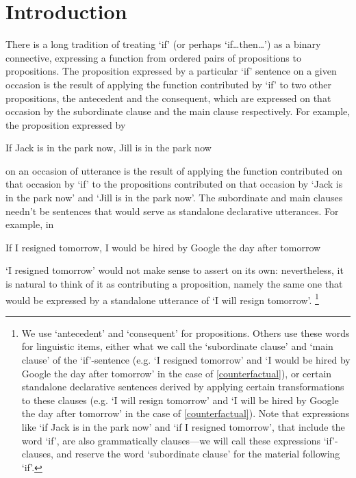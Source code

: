 \documentclass[If.tex]{subfiles}
\begin{document}
 
\chapter*{Introduction}  
There is a long tradition of treating ‘if’ (or perhaps ‘if\ldots then\ldots’) as a binary connective, expressing a function from ordered pairs of propositions to propositions. The proposition expressed by a particular ‘if’ sentence on a given occasion is the result of applying the function contributed by ‘if’ to two other propositions, the antecedent and the consequent, which are expressed on that occasion by the subordinate clause and the main clause respectively. For example, the proposition expressed by
\begin{prop}
	\nitem \label{indicative} 
	If Jack is in the park now, Jill is in the park now
\end{prop}
on an occasion of utterance is the result of applying the function contributed on that occasion by ‘if’ to the propositions contributed on that occasion by ‘Jack is in the park now’ and ‘Jill is in the park now’. The subordinate and main clauses needn't be sentences that would serve as standalone declarative utterances. For example, in
\begin{prop}
	\nitem \label{counterfactual} 
	If I resigned tomorrow, I would be hired by Google the day after tomorrow
\end{prop}
‘I resigned tomorrow’ would not make sense to assert on its own: nevertheless, it is natural to think of it as contributing a proposition, namely the same one that would be expressed by a standalone utterance of ‘I will resign tomorrow’.%
\footnote{We use ‘antecedent’ and ‘consequent’ for propositions. Others use these words for linguistic items, either what we call the ‘subordinate clause’ and ‘main clause’ of the ‘if’-sentence (e.g. ‘I resigned tomorrow’ and ‘I would be hired by Google the day after tomorrow’ in the case of \ref{counterfactual}), or certain standalone declarative sentences derived by applying certain transformations to these clauses (e.g. ‘I will resign tomorrow’ and ‘I will be hired by Google the day after tomorrow’ in the case of \ref{counterfactual}).  Note that expressions like ‘if Jack is in the park now’ and ‘if I resigned tomorrow’, that include the word ‘if’, are also grammatically clauses---we will call these expressions ‘if’-clauses, and reserve the word ‘subordinate clause’ for the material following ‘if’.}
\end{document}
